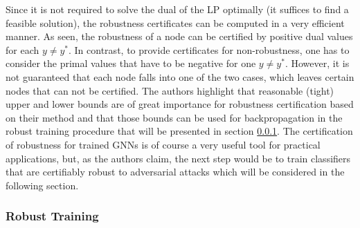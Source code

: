 \documentclass[a4paper,preprint]{sig-alternate}
\begin{document}
Since it is not required to solve the dual of the LP optimally (it suffices to find a feasible solution), the robustness certificates
can be computed in a very efficient manner. As seen, the robustness of a node can be certified by positive dual values for each $y \neq y^{\ast}$.
In contrast, to provide certificates for non-robustness, one has to consider the primal values that have to be negative for one $y \neq y^*$. \cite{Zuegner_2019}
However, it is not guaranteed that each node falls into one of the two cases, which leaves certain nodes that can not be certified.
The authors highlight that reasonable (tight) upper and lower bounds are of great importance for robustness certification based on their method
and that those bounds can be used for backpropagation in the robust training procedure that will be presented in section \ref{subsec:robust_training}.\newline
The certification of robustness for trained GNNs is of course a very useful tool for practical applications, 
but, as the authors claim, the next step would be to train classifiers that are certifiably robust to adversarial attacks 
which will be considered in the following section.

\subsubsection{Robust Training}
\label{subsec:robust_training}
\end{document}
